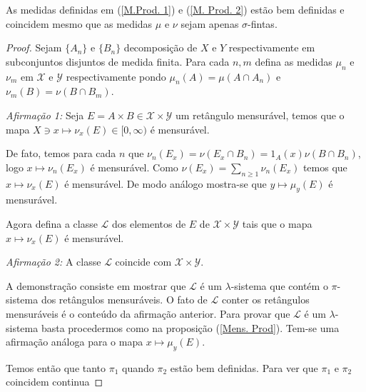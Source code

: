 \begin{corolario}
As medidas definidas em (\ref{M.Prod. 1}) e (\ref{M. Prod. 2}) estão bem definidas e  coincidem mesmo que as medidas 
$\mu$ e $\nu$ sejam apenas $\sigma$-fintas.
\end{corolario}

\begin{proof}
Sejam $\{A_n\}$ e $\{B_n\}$ decomposição de $X$ e $Y$ respectivamente em subconjuntos 
disjuntos de medida finita. Para cada $n,m$ defina as medidas $\mu_n$ e $\nu_m$ 
em  $\mathscr{X}$ e $ \mathscr{Y}$ respectivamente  pondo  $\mu_n(A)=\mu(A\cap A_n)$ e 
$\nu_m(B)=\nu(B\cap B_m)$. 
\medskip

\noindent \emph{Afirmação 1:} Seja $E=A\times B\in \mathscr{X}\times \mathscr{Y}$ um retângulo mensurável, temos que o mapa 
$X\ni x\mapsto \nu_x(E)\in [0, \infty)$ é mensurável.
\medskip


 De fato, temos para cada $n$ que  $\nu_n(E_x)=\nu(E_x\cap B_n)=1_A(x)  \nu(B\cap B_n)$, logo 
 $x\mapsto \nu_n(E_x)$ é mensurável. Como $\nu(E_x)=\sum_{n\geq 1}\nu_n(E_x)$ temos que 
 $x\mapsto \nu_x(E)$ é mensurável. De modo análogo mostra-se que $y\mapsto \mu_y(E)$ é mensurável.

Agora defina a classe $\mathscr{L}$ dos elementos de $E$ de $\mathscr{X}\times \mathscr{Y}$ tais que 
o mapa $x\mapsto \nu_x(E)$ é mensurável.

\noindent \emph{Afirmação 2:} A classe $\mathscr{L}$ coincide com $\mathscr{X}\times \mathscr{Y}$.
\medskip

A demonstração consiste em mostrar que $\mathscr{L}$ é um $\lambda$-sistema que contém o $\pi$-sistema dos 
retângulos mensuráveis.
 O fato de $\mathscr{L}$ conter os retângulos 
 mensuráveis é o conteúdo da afirmação anterior.
 Para provar que $\mathscr{L}$ é um $\lambda$-sistema basta procedermos como na proposição (\ref{Mens. Prod}).
  Tem-se uma afirmação análoga para o mapa $x\mapsto \mu_y(E)$. 
  
  Temos então que tanto $\pi_1$ quando $\pi_2$ estão bem definidas. Para ver que $\pi_1$ e $\pi_2$ coincidem 
{\red continua}


\end{proof}

